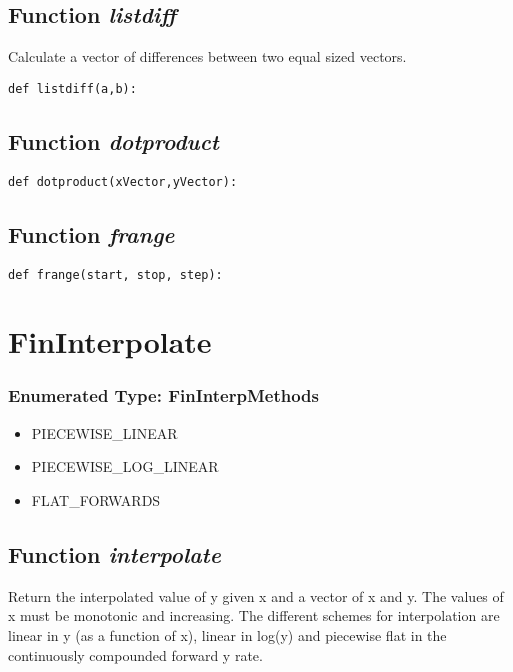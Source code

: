 \documentclass[twoside,11pt]{book}
\begin{document}
\subsection{Function {\it listdiff}}
Calculate a vector of differences between two equal sized vectors. 

\begin{lstlisting}
def listdiff(a,b):
\end{lstlisting}

\subsection{Function {\it dotproduct}}


\begin{lstlisting}
def dotproduct(xVector,yVector):
\end{lstlisting}

\subsection{Function {\it frange}}


\begin{lstlisting}
def frange(start, stop, step):
\end{lstlisting}

\newpage
\section{FinInterpolate}

\subsubsection{Enumerated Type: FinInterpMethods}
\begin{itemize}
\item{PIECEWISE\_LINEAR}
\item{PIECEWISE\_LOG\_LINEAR}
\item{FLAT\_FORWARDS}
\end{itemize}

\subsection{Function {\it interpolate}}
Return the interpolated value of y given x and a vector of x and y. The values of x must be monotonic and increasing. The different schemes for interpolation are linear in y (as a function of x), linear in log(y) and piecewise flat in the continuously compounded forward y rate. 
\end{document}
